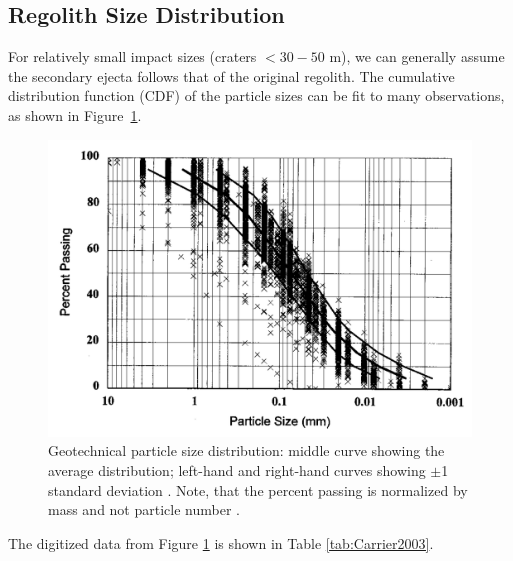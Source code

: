 \documentclass{hitec}
\numberwithin{equation}{section}
\begin{document}
\subsection{Regolith Size Distribution}
For relatively small impact sizes (craters $<30-50$ m), we can generally assume the secondary ejecta follows that of the original regolith. The cumulative distribution function (CDF) of the particle sizes can be fit to many observations, as shown in Figure~\ref{fig:Carrier2003_Fig1_particle-size-distribution}.

\begin{figure}[h!]
	\centering
	\includegraphics[scale=0.4]{Carrier2003_Fig1_particle-size-distribution.PNG}
	\caption{Geotechnical particle size distribution: middle curve showing the average distribution; left-hand and right-hand curves showing $\pm$1 standard deviation \citep{carrier2003particle}. Note, that the percent passing is normalized by mass and not particle number \citep[see][]{carrier1973lunar}.}\label{fig:Carrier2003_Fig1_particle-size-distribution}
\end{figure}

The digitized data from Figure \ref{fig:Carrier2003_Fig1_particle-size-distribution} is shown in Table \ref{tab:Carrier2003}.

\begin{table}
	\centering
	\caption{Digitized data points from Figure \ref{fig:Carrier2003_Fig1_particle-size-distribution}, see \cite{carrier2003particle}.}\label{tab:Carrier2003}
\end{table}
\end{document}

